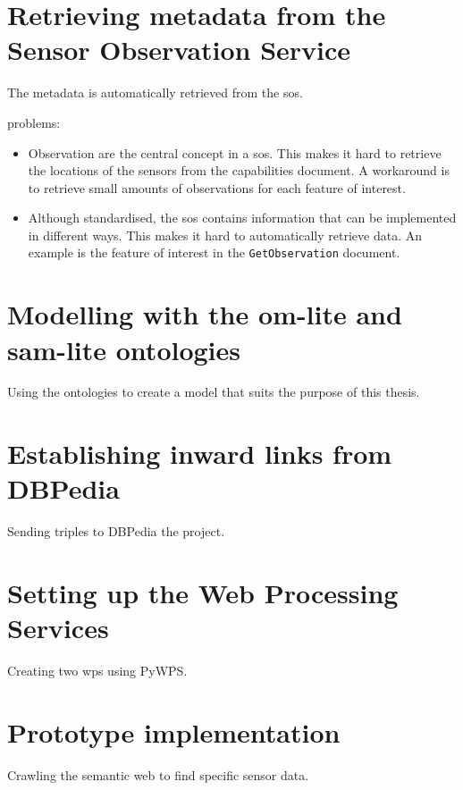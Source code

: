 \section{Retrieving metadata from the Sensor Observation Service}
The metadata is automatically retrieved from the \ac{sos}.

problems: 
\begin{itemize}
	\item Observation are the central concept in a \ac{sos}. This makes it hard to retrieve the locations of the sensors from the capabilities document. A workaround is to retrieve small amounts of observations for each feature of interest.
	\item Although standardised, the \ac{sos} contains information that can be implemented in different ways. This makes it hard to automatically retrieve data. An example is the feature of interest in the \texttt{GetObservation} document. 
\end{itemize}

\section{Modelling with the om-lite and sam-lite ontologies}
Using the ontologies to create a model that suits the purpose of this thesis.

\section{Establishing inward links from DBPedia}
Sending triples to DBPedia the project.

\section{Setting up the Web Processing Services}
Creating two \ac{wps} using PyWPS.

\section{Prototype implementation}
Crawling the semantic web to find specific sensor data.